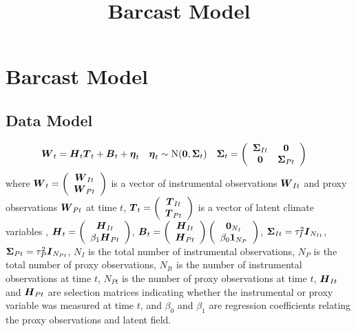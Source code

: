 \documentclass{article}\usepackage[]{graphicx}\usepackage[]{color}
\title{Barcast Model}
\def\bm#1{\mbox{\boldmath $#1$}}
\begin{document}
\maketitle
%
%
\section{Barcast Model}
%
%
\subsection{Data Model}
%
\begin{align*}
%
\bm{W}_t & = \bm{H}_t \bm{T}_t + \bm{B}_t + \bm{\eta}_t & \bm{\eta}_t & \sim \mbox{N}(\bm{0}, \bm{\Sigma}_t) & \bm{\Sigma}_t & = \left( \begin{array}{cc} \bm{\Sigma}_{It} & \bm{0}\\ \bm{0} & \bm{\Sigma}_{Pt} \end{array} \right)
%
\end{align*}
%
where $\bm{W}_t = \left( \begin{array}{c} \bm{W}_{It} \\ \bm{W}_{Pt} \end{array} \right)$ is a vector of instrumental observations $\bm{W}_{It}$ and proxy observations $\bm{W}_{Pt}$ at time $t$, $\bm{T}_t = \left( \begin{array}{c} \bm{T}_{It} \\ \bm{T}_{Pt} \end{array} \right)$ is a vector of latent climate variables , $\bm{H}_t = \left( \begin{array}{c} \bm{H}_{It}\\ \beta_1 \bm{H}_{Pt} \end{array} \right)$, $\bm{B}_t = \left( \begin{array}{c} \bm{H}_{It}\\ \bm{H}_{Pt} \end{array} \right) \left( \begin{array}{c} \bm{0}_{N_I}\\ \beta_0 \bm{1}_{N_P} \end{array} \right)$, $\bm{\Sigma}_{It} = \tau_I^2 \bm{I}_{N_{It}}$, $\bm{\Sigma}_{Pt} = \tau_P^2 \bm{I}_{N_{Pt}}$, $N_I$ is the total number of instrumental observations, $N_P$ is the total number of proxy observations, $N_{It}$ is the number of instrumental observations at time $t$, $N_{Pt}$ is the number of proxy observations at time $t$, $\bm{H}_{It}$ and $\bm{H}_{Pt}$ are selection matrices indicating whether the instrumental or proxy variable was measured at time $t$, and $\beta_0$ and $\beta_1$ are regression coefficients relating the proxy observations and latent field. 
%
%
\end{document}
